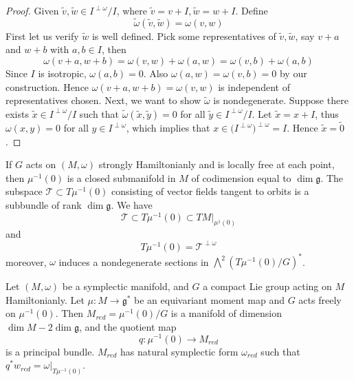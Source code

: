 \documentclass[
11pt, %
letterpaper， %
oneside, %
headinclude,footinclude, %
BCOR5mm, %
]{scrartcl}
\begin{document}
\begin{proof}
	Given $\tilde{v}, \tilde{w}\in I^{\perp \omega}/I$, where $\tilde{v}=v+I, \tilde{w}=w+I$.  Define
	\begin{equation*}
	\tilde{\omega}(\tilde{v}, \tilde{w})=\omega(v,w)
	\end{equation*}
	First let us verify $\tilde{w}$ is well defined. Pick some representatives of $\tilde{v}, \tilde{w}$, say $v+a$ and $w+b$ with $a,b\in I$, then
	\begin{equation*}
	\omega(v+a,w+b)=\omega(v,w)+\omega(a,w)=\omega(v,b)+\omega(a,b)
	\end{equation*}
	Since $I$ is isotropic, $\omega(a,b)=0$. Also $\omega(a,w)=\omega(v,b)=0$ by our construction. Hence $\omega(v+a,w+b)=\omega(v,w)$ is independent of representatives chosen. Next, we want to show $\tilde{\omega}$ is nondegenerate. Suppose there exists $\tilde{x}\in  I^{\perp \omega}/I$ such that $\tilde{\omega}(\tilde{x},\tilde{y})=0$ for all $\tilde{y}\in I^{\perp \omega}/I$. Let $\tilde{x}=x+I$, thus $\omega(x,y)=0$ for all $y\in I^{\perp \omega}$, which implies that $x\in \big(I^{\perp \omega}\big)^{\perp \omega}=I$. Hence $\tilde{x}=\tilde{0}$.
\end{proof}

\begin{cor}
	If $G$ acts on $(M, \omega)$ strongly Hamiltonianly and is locally free at each point, then $\mu^{-1}(0)$ is a closed submanifold in $M$ of codimension equal to $\dim \mathfrak{g}$. The subspace $\mathcal{T}\subset T\mu^{-1}(0)$ consisting of vector fields tangent to orbits is a subbundle of rank $\dim \mathfrak{g}$. We have 
	\begin{equation*}
	\mathcal{T}\subset T\mu^{-1}(0)\subset TM|_{\mu^{1}(0)}
	\end{equation*}
	and 
	\begin{equation*}
	T\mu^{-1}(0)=\mathcal{T}^{\perp \omega}
	\end{equation*}
	moreover, $\omega$ induces a nondegenerate sections in $\bigwedge^2(T\mu^{-1}(0)/G)^*$. 
\end{cor}

\begin{thm}[M. Weinstein]
	Let $(M, \omega)$ be a symplectic manifold, and $G$ a compact Lie group acting on $M$ Hamiltonianly. Let $\mu: M\to \mathfrak{g}^*$  be an equivariant moment map and $G$ acts freely on $\mu^{-1}(0)$. Then $M_{red}=\mu^{-1}(0)/G$ is a manifold of dimension $\dim M-2 \dim \mathfrak{g}$, and the quotient map
	\begin{equation*}
	q: \mu^{-1}(0)\to M_{red}
	\end{equation*}
	is a principal bundle. $M_{red}$ has natural symplectic form $\omega_{red}$ such that $q^* w_{red}= \omega|_{T\mu^{-1}(0)}$.
\end{thm}
\end{document}
